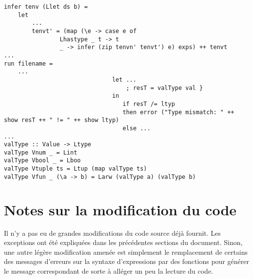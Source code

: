 \documentclass[10pt, titlepage]{article}
\begin{document}
\begin{lstlisting}
infer tenv (Llet ds b) =
    let
        ...
        tenvt' = (map (\e -> case e of
                Lhastype _ t -> t
                _ -> infer (zip tenvn' tenvt') e) exps) ++ tenvt
...
run filename =
    ...
                               let ...
                                   ; resT = valType val }
                               in 
                                  if resT /= ltyp
                                  then error ("Type mismatch: " ++ show resT ++ " != " ++ show ltyp)
                                  else ...
...
valType :: Value -> Ltype
valType Vnum _ = Lint
valType Vbool _ = Lboo
valType Vtuple ts = Ltup (map valType ts)
valType Vfun _ (\a -> b) = Larw (valType a) (valType b)
\end{lstlisting}

\section{Notes sur la modification du code}

Il n'y a pas eu de grandes modifications du code source déjà fournit. Les
exceptions ont été expliquées dans les précédentes sections du document. Sinon,
une autre légère modification amenée est simplement le remplacement de certains
des messages d'erreurs sur la syntaxe d'expressions par des fonctions pour
générer le message correspondant de sorte à alléger un peu la lecture du code.
\end{document}
